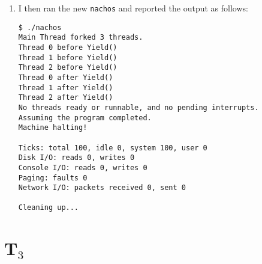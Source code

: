 \documentclass[letterpaper, 10pt]{article}
\begin{document}
\begin{enumerate}
		\item{
		I then ran the new {\tt nachos} and reported the output as follows:

		\begin{verbatim}
$ ./nachos
Main Thread forked 3 threads.
Thread 0 before Yield()
Thread 1 before Yield()
Thread 2 before Yield()
Thread 0 after Yield()
Thread 1 after Yield()
Thread 2 after Yield()
No threads ready or runnable, and no pending interrupts.
Assuming the program completed.
Machine halting!

Ticks: total 100, idle 0, system 100, user 0
Disk I/O: reads 0, writes 0
Console I/O: reads 0, writes 0
Paging: faults 0
Network I/O: packets received 0, sent 0

Cleaning up...
		\end{verbatim}
		}

	\end{enumerate}

	\section*{T$_{3}$}
\end{document}
